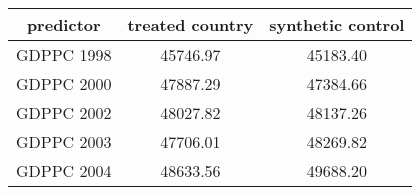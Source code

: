 \begin{tabular}{c|c|c}
predictor&\textbf{treated country}&\textbf{synthetic control}\\
\hline 
GDPPC 1998 & 45746.97 & 45183.40\\
GDPPC 2000 & 47887.29 & 47384.66\\
GDPPC 2002 & 48027.82 & 48137.26\\
GDPPC 2003 & 47706.01 & 48269.82\\
GDPPC 2004 & 48633.56 & 49688.20\\
\hline
\end{tabular}